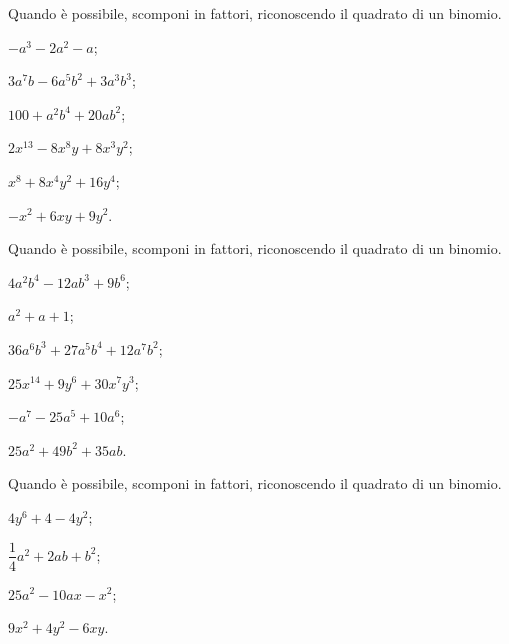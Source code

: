 \begin{esercizio}
\label{ese:13.39}
Quando è possibile, scomponi in fattori, riconoscendo il quadrato di un binomio.
\begin{multicols}{3}
\begin{enumeratea}
 \item $-a^{3}-2a^{2}-a$;
 \item $3a^{7}b-6a^{5}b^{2}+3a^{3}b^{3}$;
 \item $100+a^{2}b^{4}+20ab^{2}$;
 \item $2x^{13}-8x^{8}y+8x^{3}y^{2}$;
 \item $x^{8}+8x^{4}y^{2}+16y^{4}$;
 \item $-x^{2}+6{xy}+9y^{2}$.
\end{enumeratea}
\end{multicols}
\end{esercizio}

\begin{esercizio}
\label{ese:13.40}
Quando è possibile, scomponi in fattori, riconoscendo il quadrato di un binomio.
\begin{multicols}{2}
\begin{enumeratea}
 \item $4a^{2}b^{4}-12ab^{3}+9b^{6}$;
 \item $a^{2}+a+1$;
 \item $36a^{6}b^{3}+27a^{5}b^{4}+12a^{7}b^{2}$;
 \item $25x^{14}+9y^{6}+30x^{7}y^{3}$;
 \item $-a^{7}-25a^{5}+10a^{6}$;
 \item $25a^{2}+49b^{2}+35ab$.
\end{enumeratea}
\end{multicols}
\end{esercizio}

\begin{esercizio}
\label{ese:13.41}
Quando è possibile, scomponi in fattori, riconoscendo il quadrato di un binomio.
\begin{multicols}{2}
\begin{enumeratea}
 \item $4y^{6}+4-4y^{2}$;
 \item $\dfrac{1}{4}a^{2}+2ab+b^{2}$;
 \item $25a^{2}-10{ax}-x^{2}$;
 \item $9x^{2}+4y^{2}-6{xy}$.
\end{enumeratea}
\end{multicols}
\end{esercizio}

